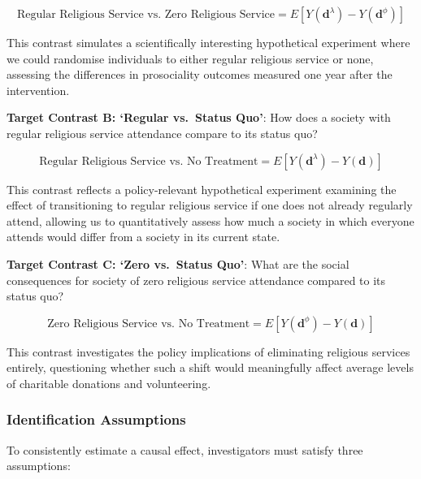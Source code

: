 \documentclass[
  single column]{article}
\begin{document}
\[ \text{Regular Religious Service vs. Zero Religious Service} = E[Y(\mathbf{d}^\lambda) - Y(\mathbf{d}^\phi)] \]

This contrast simulates a scientifically interesting hypothetical
experiment where we could randomise individuals to either regular
religious service or none, assessing the differences in prosociality
outcomes measured one year after the intervention.

\textbf{Target Contrast B: `Regular vs.~Status Quo'}: How does a society
with regular religious service attendance compare to its status quo?

\[ \text{Regular Religious Service vs. No Treatment} = E[Y(\mathbf{d}^\lambda) - Y(\mathbf{d})] \]

This contrast reflects a policy-relevant hypothetical experiment
examining the effect of transitioning to regular religious service if
one does not already regularly attend, allowing us to quantitatively
assess how much a society in which everyone attends would differ from a
society in its current state.

\textbf{Target Contrast C: `Zero vs.~Status Quo'}: What are the social
consequences for society of zero religious service attendance compared
to its status quo?

\[ \text{Zero Religious Service vs. No Treatment} = E[Y(\mathbf{d}^\phi) - Y(\mathbf{d})] \]

This contrast investigates the policy implications of eliminating
religious services entirely, questioning whether such a shift would
meaningfully affect average levels of charitable donations and
volunteering.

\subsubsection{Identification
Assumptions}\label{identification-assumptions}

To consistently estimate a causal effect, investigators must satisfy
three assumptions:
\end{document}
